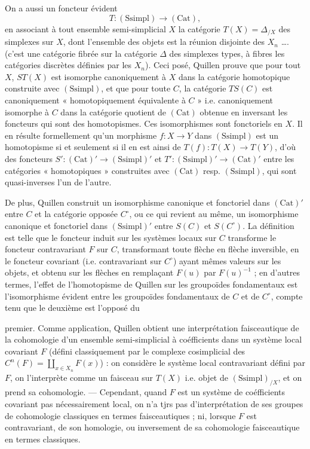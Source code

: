 \documentclass[11pt,a4paper]{article}
\begin{document}
On a aussi un foncteur évident
\[
T : (\mathrm{Ssimpl}) \longrightarrow (\mathrm{Cat}) ,
\]
en associant à tout ensemble semi-simplicial $X$ la catégorie
$T(X) = \Delta_{/X}$ des simplexes sur $X$, dont l'ensemble des objets est
la réunion disjointe des $X_n$ …. (c'est une catégorie fibrée sur la
catégorie $\Delta$ des simplexes types, à fibres les catégories discrètes
définies par les $X_n$). Ceci posé, Quillen prouve que pour tout $X$,
$ST(X)$ est isomorphe canoniquement à $X$ dans la catégorie homotopique
construite avec $(\mathrm{Ssimpl})$, et que pour toute $C$, la catégorie
$TS(C)$ est canoniquement « homotopiquement équivalente à $C$ » i.e.
canoniquement isomorphe à $C$ dans la catégorie quotient de
$(\mathrm{Cat})$ obtenue en inversant les foncteurs qui sont des
homotopismes. Ces isomorphismes sont fonctoriels en $X$. Il en résulte
formellement qu'un morphisme $f : X \to Y$ dans $(\mathrm{Ssimpl})$ est un
homotopisme si et seulement si il en est ainsi de
$T(f) : T(X) \to T(Y)$, d'où des foncteurs
$S' : (\mathrm{Cat})' \to (\mathrm{Ssimpl})'$ et
$T' : (\mathrm{Ssimpl})' \to (\mathrm{Cat})'$ entre les catégories
« homotopiques » construites avec $(\mathrm{Cat})$ resp.
$(\mathrm{Ssimpl})$, qui sont quasi-inverses l'un de l'autre.

De plus, Quillen construit un isomorphisme canonique et fonctoriel dans
$(\mathrm{Cat})'$ entre $C$ et la catégorie opposée $C^{\circ}$, ou ce qui
revient au même, un isomorphisme canonique et fonctoriel dans
$(\mathrm{Ssimpl})'$ entre $S(C)$ et $S(C^{\circ})$. La définition est telle
que le foncteur induit sur les systèmes locaux sur $C$ transforme le
foncteur contravariant $F$ sur $C$, transformant toute flèche en flèche
inversible, en le foncteur covariant (i.e. contravariant sur $C^{\circ}$)
ayant mêmes valeurs sur les objets, et obtenu sur les flèches en remplaçant
$F(u)$ par $F(u)^{-1}$ ; en d'autres termes, l'effet de l'homotopisme de
Quillen sur les groupoïdes fondamentaux est l'isomorphisme évident entre
les groupoïdes fondamentaux de $C$ et de $C^{\circ}$, compte tenu que le
deuxième est l'opposé du

premier. Comme application, Quillen obtient une interprétation faisceautique
de la cohomologie d'un ensemble semi-simplicial à coéfficients dans un
système local covariant $F$ (défini
classiquement par le complexe cosimplicial des
$C^n(F) = \coprod_{x \in X_n} F(x)$) : on considère le système local
contravariant défini par $F$, on l'interprète comme un faisceau sur
$T(X)$ i.e. objet de $(\mathrm{Ssimpl})_{/X}$, et on prend sa
cohomologie. — Cependant, quand $F$ est un système de coéfficients
covariant pas nécessairement local, on n'a tjrs pas d'interprétation de
ses groupes de cohomologie classiques en termes faisceautiques ; ni,
lorsque $F$ est contravariant, de son homologie, ou inversement de sa
cohomologie faisceautique en termes classiques.
\end{document}
